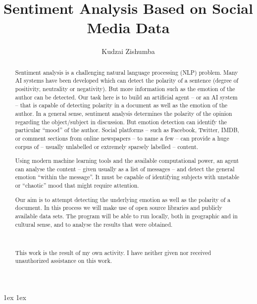 \documentclass[final,a4paper]{aust_thesis}
\title{%
Sentiment Analysis Based on Social Media Data
}
\author{%
Kudzai Zishumba
}
\begin{document}
\begin{abstract}%

Sentiment analysis is a challenging natural language processing (NLP) problem.
%
Many AI systems have been developed which can detect the polarity of a sentence (degree of positivity, neutrality or negativity). But more information such as the emotion of the author can be detected.
Our task here is to build an artificial agent -- or an AI system -- that is capable of detecting polarity in a document as well as the emotion of the author.
%
In a general sense, sentiment analysis determines the polarity of the opinion regarding the object/subject in discussion.
%
But emotion detection can identify the particular ``mood'' of the author.
%
Social platforms -- such as Facebook, Twitter, IMDB, or comment sections from online newspapers -- to name a few -- can provide a huge corpus of -- usually unlabelled or extremely sparsely labelled -- content.

Using modern machine learning tools and the available computational power, an agent can analyse the content -- given usually as a list of messages -- and detect the general emotion ``within the message''.
%
It must be capable of identifying subjects with unstable or ``chaotic'' mood that might require attention.

Our aim is to attempt detecting the underlying emotion as well as the polarity of a document.
%
In this process we will make use of open source libraries and publicly available data sets.
%
The program will be able to run locally, both in geographic and in cultural sense, and to analyse the results that were obtained.

~

This work is the result of my own activity. I have neither given nor received unauthorized assistance on this work.

\end{abstract}

\maketitle


{ \baselineskip 1ex
  \parskip 1ex
  \tableofcontents
}







\appendix



{ \renewcommand{\baselinestretch}{0.8}\normalsize %
  \setlength{\itemsep}{-2.4mm}
  \setlength{\bibspacing}{0.67\baselineskip}
  
  
}
\end{document}
